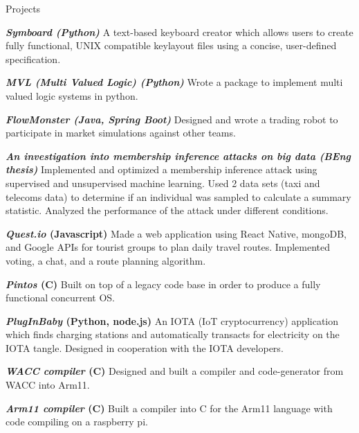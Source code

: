 \documentclass[10pt]{resume} %
\begin{document}
\begin{rSection}{Projects}

  \item \textbf{\textit{Symboard (Python)}} A text-based keyboard creator which
    allows users to create fully functional, UNIX compatible keylayout files
    using a concise, user-defined specification.
  \item \textbf{\textit{MVL (Multi Valued Logic) (Python)}} Wrote a package to
    implement multi valued logic systems in python.
  \item \textbf{\textit{FlowMonster (Java, Spring Boot)}} Designed and wrote a
    trading robot to participate in market simulations against other teams.
  \item \textbf{\textit{An investigation into membership inference attacks on
    big data (BEng thesis)}} Implemented and optimized a membership inference
    attack using supervised and unsupervised machine learning. Used 2 data sets
    (taxi and telecoms data) to determine if an individual was sampled to
    calculate a summary statistic. Analyzed the performance of the attack
    under different conditions.
  \item \textbf{\textit{Quest.io} (Javascript)} Made a web application using
    React Native, mongoDB, and Google APIs for tourist groups to plan daily
    travel routes. Implemented voting, a chat, and a route planning algorithm.
  \item \textbf{\textit{Pintos} (C)} Built on top of a legacy code base in
    order to produce a fully functional concurrent OS.
  \item \textbf{\textit{PlugInBaby} (Python, node.js)} An IOTA (IoT
    cryptocurrency) application which finds charging stations and
    automatically transacts for electricity on the IOTA tangle. Designed in
    cooperation with the IOTA developers.
  \item \textbf{\textit{WACC compiler} (C)} Designed and built a compiler and
    code-generator from WACC into Arm11.
  \item \textbf{\textit{Arm11 compiler} (C)} Built a compiler into C for the
    Arm11 language with code compiling on a raspberry pi.

\end{rSection}

\end{document}
